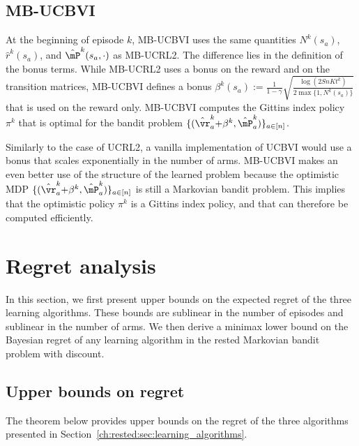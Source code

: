 \subsection{MB-UCBVI}

At the beginning of episode $k$, MB-UCBVI uses the same quantities $N^{k}(s_a)$, $\hat{r}^{k}(s_a)$, and $\hat{\mP}^{k}(s_a,\cdot)$ as MB-UCRL2. The difference lies in the definition of the bonus terms. While MB-UCRL2 uses a bonus on the reward and on the transition matrices, MB-UCBVI defines a bonus $\beta^{k}_{}(s_a){:=}\frac{1}{1-\gamma}\sqrt{\frac{\log(2SnKt^k)}{2\max\{1,N^{k}(s_a)\}}}$ that is used on the reward only. MB-UCBVI computes the Gittins index policy $\pi^k$ that is optimal for the bandit problem $\{(\hat{\vr}^{k}_a {+}\beta^{k}_{}, \hat{\mP}^{k}_a)\}_{a\in[n]}$. 

Similarly to the case of UCRL2, a vanilla implementation of UCBVI would use a bonus that scales exponentially in the number of arms. MB-UCBVI makes an even  better use of the structure of the learned problem because the optimistic MDP $\{(\hat{\vr}^{k}_a {+}\beta^{k}_{}, \hat{\mP}^{k}_a)\}_{a\in[n]}$ is still a Markovian bandit problem. This implies that the optimistic policy $\pi^k$ is a Gittins index policy, and that can therefore be computed efficiently.

\section{Regret analysis}
\label{ch:rested:sec:analysis}

In this section, we first present upper bounds on the expected regret of the three learning algorithms. These bounds are sublinear in the number of episodes and sublinear in the number of arms. We then derive a minimax lower bound on the Bayesian regret of any learning algorithm in the rested Markovian bandit problem with discount. 

\subsection{Upper bounds on regret}
\label{ssec:upper_bound_psrl}

The theorem below provides upper bounds on the regret of the three algorithms presented in Section~\ref{ch:rested:sec:learning_algorithms}. %

